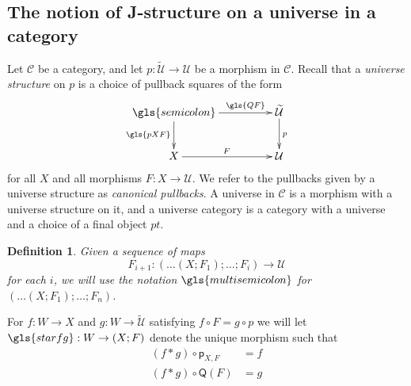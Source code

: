 \documentclass[12pt]{article}
\numberwithin{equation}{section}
\newenvironment{eq}{\begin{equation}}{\end{equation}}
\newtheorem{definition}[proposition]{Definition}
\newcommand{\sr}{\rightarrow}
\newcommand{\wt}{\widetilde}
\newcommand{\C}{{\mathcal C}}  %
\newcommand{\p}{\mathsf{p}}
\newcommand{\U}{\mathcal{U}}
\newcommand{\Q}{\mathsf{Q}}
\begin{document}
\subsection{The notion of J-structure on a universe in a category}
%
Let $\C$ be a category,
and let $p:\wt{\U}\sr \U$ be a morphism in
$\C$. Recall \cite{Cfromauniverse} that a {\em universe structure} on $p$ is a choice of pullback
squares of the form
%
\begin{eq}
\begin{xy}
          \xymatrix@C=4pc{ \gls{semicolon} \ar[r]^-{\gls{QF}} \ar[d]_{\gls{pXF}} & \wt{\U}
            \ar[d]^{p}\\ X \ar[r]^{F} & \U }
\end{xy}\label{univstrdiag}
\end{eq}
%
for all $X$ and all morphisms $F:X\sr \U$.
We refer to the pullbacks given by a universe structure as \emph{canonical pullbacks}.
A universe in $\C$ is a
morphism with a universe structure on it, and a universe category is a category
with a universe and a choice of a final object $pt$.

\begin{definition}\label{iter-univ-str}
  Given a sequence of maps $$F_{i+1} : (\dots(X;F_1);\dots;F_i) \to \U$$ for each $i$,
  we will use the notation $\gls{multisemicolon}$ for $(\dots(X;F_1);\dots;F_n)$.
\end{definition}

For $f:W\sr X$ and $g:W\sr \wt{\U}$ satisfying $f\circ F = g \circ p$ we will let $\gls{starfg} : W \sr (X;F)$ denote the unique morphism
such that
%
\begin{align}
  (f*g)\circ \p_{X,F} & =f \label{star-eq1} \\
  (f*g)\circ \Q(F) & =g \label{star-eq2}
\end{align}
\end{document}
